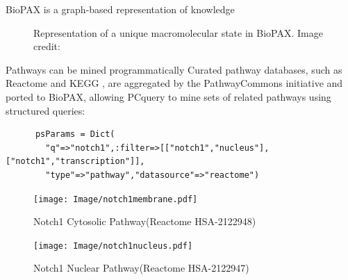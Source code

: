 \documentclass[final]{beamer}
\newlength{\colwidth}
\begin{document}
\begin{frame}[t,fragile]
\begin{columns}[t]
\begin{column}{\colwidth}
\begin{exampleblock}{BioPAX is a graph-based representation of knowledge}
\begin{figure}
\begin{minipage}{0.4\textwidth}
        \caption{Representation of a unique macromolecular state in BioPAX.  Image credit: \cite{demir2010biopax}}
      \end{minipage}
    \end{figure}
  \end{exampleblock}

  \begin{block}{Pathways can be mined programmatically}
    Curated pathway databases, such as Reactome \cite{fabregat2018reactome} and KEGG \cite{kanehisa2007kegg}, are aggregated by the PathwayCommons \cite{rodchenkov2020pathway} initiative and ported to BioPAX, allowing PCquery to mine sets of related pathways using structured queries:
    \footnotesize
    \begin{lstlisting}
      psParams = Dict(
        "q"=>"notch1",:filter=>[["notch1","nucleus"],["notch1","transcription"]],
        "type"=>"pathway","datasource"=>"reactome")
    \end{lstlisting}

    \begin{figure}
      \centering
      \footnotesize
      \begin{minipage}{0.45\textwidth}
        \texttt{[image: Image/notch1membrane.pdf]}
        \caption{Notch1 Cytosolic Pathway\newline(Reactome HSA-2122948)}
      \end{minipage}
      \hspace{2.5cm}
      \begin{minipage}{0.45\textwidth}
        \texttt{[image: Image/notch1nucleus.pdf]}
        \caption{Notch1 Nuclear Pathway\newline(Reactome HSA-2122947)}
      \end{minipage}
    \end{figure}
  \end{block}


\end{column}
\end{columns}
\end{frame}
\end{document}
